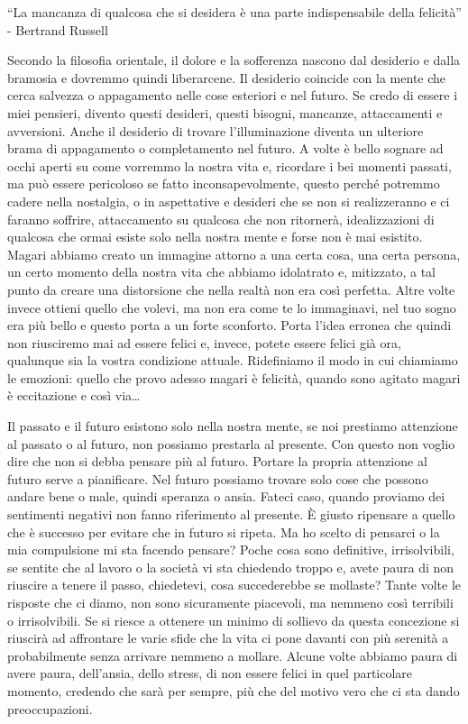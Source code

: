 \documentclass[12pt]{book} %
\begin{document}
“La mancanza di qualcosa che si desidera è una parte indispensabile della felicità” - Bertrand Russell

Secondo la filosofia orientale, il dolore e la sofferenza nascono dal desiderio e dalla bramosia e dovremmo quindi
liberarcene. Il desiderio coincide con la mente che cerca salvezza o appagamento nelle cose esteriori e nel futuro. Se
credo di essere i miei pensieri, divento questi desideri, questi bisogni, mancanze, attaccamenti e avversioni. Anche il
desiderio di trovare l'illuminazione diventa un ulteriore brama di appagamento o completamento nel
futuro. A volte è bello sognare ad occhi aperti su come vorremmo la nostra vita e, ricordare i bei momenti passati, ma può essere
pericoloso se fatto inconsapevolmente, questo perché potremmo cadere nella nostalgia, o in aspettative e desideri che se non si realizzeranno e ci faranno soffrire, attaccamento su qualcosa che non ritornerà, idealizzazioni di qualcosa che ormai esiste solo nella nostra mente e forse non è mai
esistito. Magari abbiamo creato un immagine attorno a una certa cosa, una certa persona, un certo momento della nostra
vita che abbiamo idolatrato e, mitizzato, a tal punto da creare una distorsione che nella realtà non era così perfetta.
Altre volte invece ottieni quello che volevi, ma non era come te lo immaginavi, nel tuo sogno era più bello e questo
porta a un forte sconforto. Porta l'idea erronea che quindi non riusciremo mai ad essere felici e, invece, potete
essere felici già ora, qualunque sia la vostra condizione attuale. Ridefiniamo il modo in cui chiamiamo le emozioni:
quello che provo adesso magari è felicità, quando sono agitato magari è eccitazione e così via…

Il passato e il futuro
esistono solo nella nostra mente, se noi prestiamo attenzione al passato o al futuro, non possiamo prestarla al
presente. Con questo non voglio dire che non
si debba pensare più al futuro. Portare la propria attenzione al futuro serve a pianificare. Nel futuro possiamo trovare solo cose che possono
andare bene o male, quindi speranza o ansia. Fateci caso, quando proviamo dei sentimenti negativi non fanno riferimento
al presente. È giusto ripensare a quello che è successo per evitare che in futuro si ripeta. Ma ho scelto di pensarci o la mia compulsione mi sta facendo pensare?
Poche cosa sono definitive, irrisolvibili, se sentite che al lavoro o la società
vi sta chiedendo troppo e, avete paura di non riuscire a tenere il passo, chiedetevi, cosa succederebbe se mollaste?
Tante volte le risposte che ci diamo, non sono sicuramente piacevoli, ma nemmeno così terribili o irrisolvibili. Se si riesce a ottenere un minimo di sollievo da questa concezione si
riuscirà ad affrontare le varie sfide che la vita ci pone davanti con più serenità a probabilmente senza arrivare
nemmeno a mollare. Alcune volte abbiamo paura di avere paura, dell'ansia, dello stress, di non
essere felici in quel particolare momento, credendo che sarà per sempre, più che del motivo vero che ci sta dando
preoccupazioni.
\end{document}
